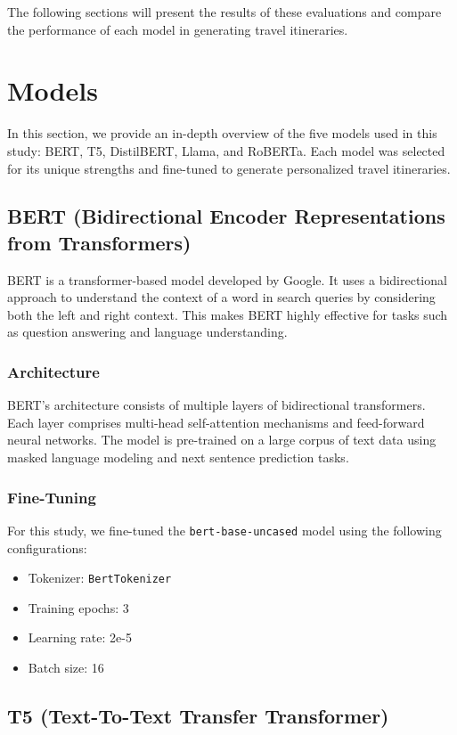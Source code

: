 \documentclass[conference]{IEEEtran}
\begin{document}
The following sections will present the results of these evaluations and compare the performance of each model in generating travel itineraries.

\section{Models}

In this section, we provide an in-depth overview of the five models used in this study: BERT, T5, DistilBERT, Llama, and RoBERTa. Each model was selected for its unique strengths and fine-tuned to generate personalized travel itineraries.

\subsection{BERT (Bidirectional Encoder Representations from Transformers)}

BERT is a transformer-based model developed by Google. It uses a bidirectional approach to understand the context of a word in search queries by considering both the left and right context. This makes BERT highly effective for tasks such as question answering and language understanding.

\subsubsection{Architecture}
BERT's architecture consists of multiple layers of bidirectional transformers. Each layer comprises multi-head self-attention mechanisms and feed-forward neural networks. The model is pre-trained on a large corpus of text data using masked language modeling and next sentence prediction tasks.

\subsubsection{Fine-Tuning}
For this study, we fine-tuned the \texttt{bert-base-uncased} model using the following configurations:
\begin{itemize}
    \item Tokenizer: \texttt{BertTokenizer}
    \item Training epochs: 3
    \item Learning rate: 2e-5
    \item Batch size: 16
\end{itemize}

\subsection{T5 (Text-To-Text Transfer Transformer)}
\end{document}
